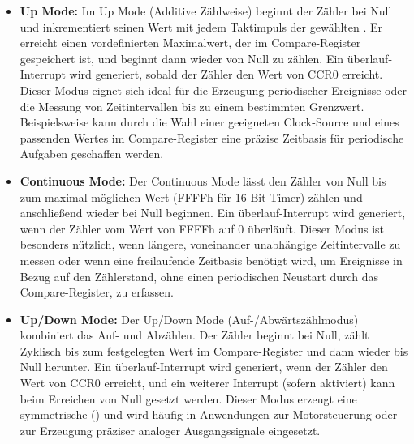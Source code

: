 \begin{itemize}
	\item \textbf{Up Mode:} Im Up Mode (Additive Z\"ahlweise) beginnt der Z\"ahler bei Null und inkrementiert seinen Wert mit jedem Taktimpuls der gew\"ahlten . Er erreicht einen vordefinierten Maximalwert, der im Compare-Register gespeichert ist, und beginnt dann wieder von Null zu z\"ahlen. Ein \"uberlauf-Interrupt wird generiert, sobald der Z\"ahler den Wert von CCR0 erreicht. Dieser Modus eignet sich ideal f\"ur die Erzeugung periodischer Ereignisse oder die Messung von Zeitintervallen bis zu einem bestimmten Grenzwert. Beispielsweise kann durch die Wahl einer geeigneten Clock-Source und eines passenden Wertes im Compare-Register eine pr\"azise Zeitbasis f\"ur periodische Aufgaben geschaffen werden. 
	
	\item \textbf{Continuous Mode:} Der Continuous Mode l\"asst den Z\"ahler von Null bis zum maximal m\"oglichen Wert (FFFFh f\"ur 16-Bit-Timer) z\"ahlen und anschlie{\ss}end wieder bei Null beginnen. Ein \"uberlauf-Interrupt wird generiert, wenn der Z\"ahler vom Wert von FFFFh auf 0 \"uberl\"auft.  Dieser Modus ist besonders n\"utzlich, wenn l\"angere, voneinander unabh\"angige Zeitintervalle zu messen oder wenn eine freilaufende Zeitbasis ben\"otigt wird, um Ereignisse in Bezug auf den Z\"ahlerstand, ohne einen periodischen Neustart durch das Compare-Register, zu erfassen. 

	\item \textbf{Up/Down Mode:} Der Up/Down Mode (Auf-/Abw\"artsz\"ahlmodus) kombiniert das Auf- und Abz\"ahlen. Der Z\"ahler beginnt bei Null, z\"ahlt Zyklisch bis zum festgelegten Wert im Compare-Register und dann wieder bis Null herunter. Ein \"uberlauf-Interrupt wird generiert, wenn der Z\"ahler den Wert von CCR0 erreicht, und ein weiterer Interrupt (sofern aktiviert) kann beim Erreichen von Null gesetzt werden.  Dieser Modus erzeugt eine symmetrische  () und wird h\"aufig in Anwendungen zur Motorsteuerung oder zur Erzeugung pr\"aziser analoger Ausgangssignale eingesetzt. 
\end{itemize}

